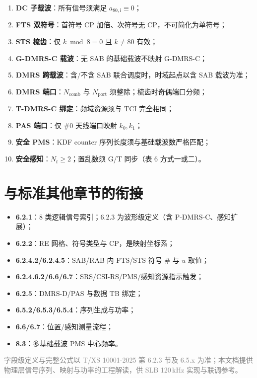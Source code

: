 \documentclass[11pt,a4paper]{ctexart}
\begin{document}
\begin{enumerate}[nosep]
  \item \textbf{DC 子载波}：所有信号须满足 $a_{80,l}\equiv 0$；
  \item \textbf{FTS 双符号}：首符号 CP 加倍、次符号无 CP，不可简化为单符号；
  \item \textbf{STS 梳齿}：仅 $k \bmod 8 = 0$ 且 $k{\neq}80$ 有效；
  \item \textbf{G-DMRS-C 载波}：无 SAB 的基础载波不映射 G-DMRS-C；
  \item \textbf{DMRS 跨载波}：含/不含 SAB 联合调度时，时域起点以含 SAB 载波为准；
  \item \textbf{DMRS 端口}：$N_{\mathrm{comb}}$ 与 $N_{\mathrm{port}}$ 须整除；梳齿时奇偶端口分频；
  \item \textbf{T-DMRS-C 绑定}：频域资源须与 TCI 完全相同；
  \item \textbf{PAS 端口}：仅 \#0 天线端口映射 $k_0,k_1$；
  \item \textbf{安全 PMS}：KDF counter 序列长度须与基础载波数严格匹配；
  \item \textbf{安全感知}：$N_t \geq 2$；置乱数须 G/T 同步（表 6 方式一或二）。
\end{enumerate}

\section{与标准其他章节的衔接}

\begin{itemize}[nosep]
  \item \textbf{6.2.1}：8 类逻辑信号索引；6.2.3 为波形级定义（含 P-DMRS-C、感知扩展）；
  \item \textbf{6.2.2}：RE 网格、符号类型与 CP，是映射坐标系；
  \item \textbf{6.2.4.2/6.2.4.5}：SAB/RAB 内 FTS/STS 符号 \# 与 $u$ 取值；
  \item \textbf{6.2.4.6.2/6.6/6.7}：SRS/CSI-RS/PMS/感知资源指示触发；
  \item \textbf{6.2.5}：DMRS-D/PAS 与数据 TB 绑定；
  \item \textbf{6.5.2/6.5.3/6.5.4}：序列生成与功率；
  \item \textbf{6.6/6.7}：位置/感知测量流程；
  \item \textbf{8.3}：多基础载波 PMS 中心频率。
\end{itemize}

\vfill
\begin{center}
\small\textcolor{gray}{字段级定义与完整公式以 T/XS 10001-2025 第 6.2.3 节及 6.5.x 为准；本文档提供物理层信号序列、映射与功率的工程解读，供 SLB 120\,kHz 实现与联调参考。}
\end{center}
\end{document}
